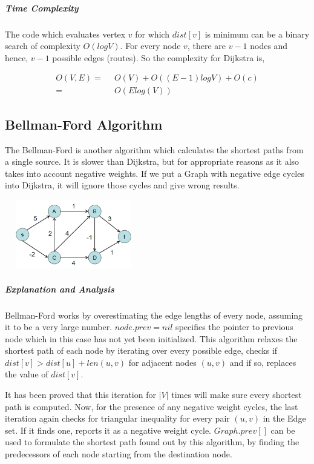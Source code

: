 \documentclass[11pt,a4paper]{extarticle}
\begin{document}
\subparagraph{Time Complexity}
The code which evaluates vertex $v$ for which $dist[v]$ is minimum can be a binary search of complexity $O(logV)$. For every node $v$, there are $v-1$ nodes and hence, $v-1$ possible edges (routes). So the complexity for Dijkstra is,

\begin{align}
O(V,E) =& \,\,\,O(V) + O((E-1)logV) + O(c)\\
	   =& \,\,\,O(Elog(V))
\end{align}

\subsection{Bellman-Ford Algorithm}
The Bellman-Ford is another algorithm which calculates the shortest paths from a single source. It is slower than Dijkstra, but for appropriate reasons as it also takes into account negative weights. If we put a Graph with negative edge cycles into Dijkstra, it will ignore those cycles and give wrong results.

\begin{center}
	\includegraphics[width=6cm, height=3cm]{bellford}
\end{center}

\begin{adjustwidth}{2.5em}{0pt}

\end{adjustwidth}

\subparagraph{Explanation and Analysis}
Bellman-Ford works by overestimating the edge lengths of every node, assuming it to be a very large number. $node.prev = nil$ specifies the pointer to previous node which in this case has not yet been initialized. This algorithm relaxes the shortest path of each node by iterating over every possible edge, checks if $dist[v] > dist[u] + len(u,v)$ for adjacent nodes $(u,v)$ and if so, replaces the value of $dist[v]$. 

It has been proved that this iteration for $|V|$ times will make sure every shortest path is computed. Now, for the presence of any negative weight cycles, the last iteration again checks for triangular inequality for every pair $(u,v)$ in the Edge set. If it finds one, reports it as a negative weight cycle. $Graph.prev[]$ can be used to formulate the shortest path found out by this algorithm, by finding the predecessors of each node starting from the destination node.
\end{document}
